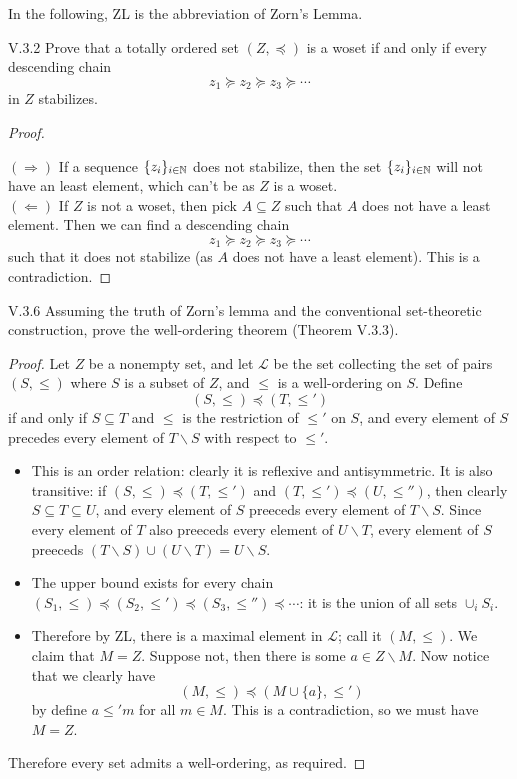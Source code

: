 \section{}

In the following, ZL is the abbreviation of Zorn's Lemma.

\begin{problem}{V.3.2}
Prove that a totally ordered set $(Z, \preceq)$ is a woset if and only if every descending chain
\[
z_1 \succeq z_2 \succeq z_3 \succeq \cdots
\]
in $Z$ stabilizes.
\end{problem}
\begin{proof} \

\noindent $(\Rightarrow)$ If a sequence $\{z_i\}_{i \in \mathbb{N}}$ does not stabilize, then the set $\{z_i\}_{i \in \mathbb{N}}$ will not have an least element, which can't be as $Z$ is a woset. \\
$(\Leftarrow)$ If $Z$ is not a woset, then pick $A \subseteq Z$ such that $A$ does not have a least element. Then we can find a descending chain
\[
z_1 \succeq z_2 \succeq z_3 \succeq \cdots
\]
such that it does not stabilize (as $A$ does not have a least element). This is a contradiction.
\end{proof}

\begin{problem}{V.3.6}
Assuming the truth of Zorn's lemma and the conventional set-theoretic construction, prove the well-ordering theorem (Theorem V.3.3).
\end{problem}
\begin{proof}
Let $Z$ be a nonempty set, and let $\mathscr{L}$ be the set collecting the set of pairs $(S,\leq)$ where $S$ is a subset of $Z$, and $\leq$ is a well-ordering on $S$. Define
\[
(S,\leq) \preceq (T,\leq')
\]
if and only if $S \subseteq T$ and $\leq$ is the restriction of $\leq'$ on $S$, and every element of $S$ precedes every element of $T \backslash S$ with respect to $\leq'$.
\begin{itemize}
	\setlength\itemsep{0pt}
	\item This is an order relation: clearly it is reflexive and antisymmetric. It is also transitive: if $(S,\leq) \preceq (T,\leq')$ and $(T,\leq') \preceq (U,\leq'')$, then clearly $S \subseteq T \subseteq U$, and every element of $S$ preeceds every element of $T \backslash S$. Since every element of $T$ also preeceds every element of $U \backslash T$, every element of $S$ preeceds $(T \backslash S) \cup (U \backslash T) = U \backslash S$.
	\item The upper bound exists for every chain $(S_1,\leq) \preceq (S_2,\leq') \preceq (S_3,\leq'') \preceq \cdots$: it is the union of all sets $\cup_{i} S_i$.  
	\item Therefore by ZL, there is a maximal element in $\mathscr{L}$; call it $(M, \leq)$. We claim that $M = Z$. Suppose not, then there is some $a \in Z \backslash M$. Now notice that we clearly have
	\[
	(M, \leq) \preceq (M \cup \{a\}, \leq')
	\]
	by define $a \leq' m$ for all $m \in M$. This is a contradiction, so we must have $M = Z$.
\end{itemize}
Therefore every set admits a well-ordering, as required.
\end{proof}


